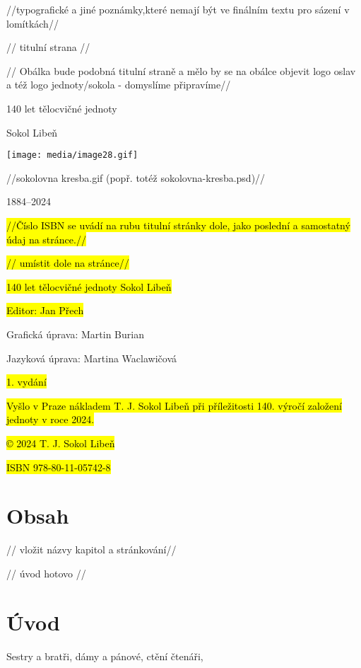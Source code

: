//typografické a jiné poznámky,které nemají být ve finálním textu pro
sázení v lomítkách//

// titulní strana //

// Obálka bude podobná titulní straně a mělo by se na obálce objevit
logo oslav a též logo jednoty/sokola - domyslíme připravíme//

140 let tělocvičné jednoty

Sokol Libeň

\texttt{[image: media/image28.gif]}

//sokolovna kresba.gif (popř. totéž sokolovna-kresba.psd)//

1884--2024

\hl{//Číslo ISBN se uvádí na rubu titulní stránky dole, jako poslední a
samostatný údaj na stránce.//}

\hl{// umístit dole na stránce//}

\hl{140 let tělocvičné jednoty Sokol Libeň}

\hl{Editor: Jan Přech}

Grafická úprava: Martin Burian

Jazyková úprava: Martina Waclawičová

\hl{1. vydání}

\hl{Vyšlo v Praze nákladem T. J. Sokol Libeň při příležitosti 140.
výročí založení jednoty v roce 2024.}

\hl{© 2024 T. J. Sokol Libeň}

\hl{ISBN 978-80-11-05742-8}

\section{Obsah}\label{obsah}

// vložit názvy kapitol a stránkování//

// úvod hotovo //

\section{Úvod}\label{uxfavod}

Sestry a bratři, dámy a pánové, ctění čtenáři,

